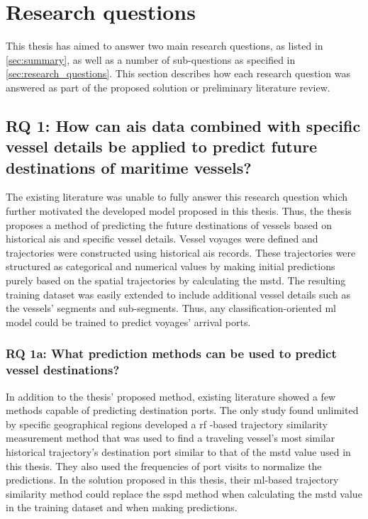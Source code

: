\section{Research questions}

This thesis has aimed to answer two main research questions, as listed in \cref{sec:summary}, as well as a number of sub-questions as specified in \cref{sec:research_questions}. This section describes how each research question was answered as part of the proposed solution or preliminary literature review.

\subsection{RQ 1: How can \acrshort{ais} data combined with specific vessel details be applied to predict future destinations of maritime vessels?}

The existing literature was unable to fully answer this research question which further motivated the developed model proposed in this thesis. Thus, the thesis proposes a method of predicting the future destinations of vessels based on historical \acrshort{ais} and specific vessel details. Vessel voyages were defined and trajectories were constructed using historical \acrshort{ais} records. These trajectories were structured as categorical and numerical values by making initial predictions purely based on the spatial trajectories by calculating the \acrfull{mstd}. The resulting training dataset was easily extended to include additional vessel details such as the vessels' segments and sub-segments. Thus, any classification-oriented \acrshort{ml} model could be trained to predict voyages' arrival ports.

\subsubsection{RQ 1a: What prediction methods can be used to predict vessel destinations?}

In addition to the thesis' proposed method, existing literature showed a few methods capable of predicting destination ports. The only study found unlimited by specific geographical regions developed a \acrfull{rf} -based trajectory similarity measurement method that was used to find a traveling vessel's most similar historical trajectory's destination port similar to that of the \acrshort{mstd} value used in this thesis. They also used the frequencies of port visits to normalize the predictions. In the solution proposed in this thesis, their \acrshort{ml}-based trajectory similarity method could replace the \acrshort{sspd} method when calculating the \acrshort{mstd} value in the training dataset and when making predictions.

